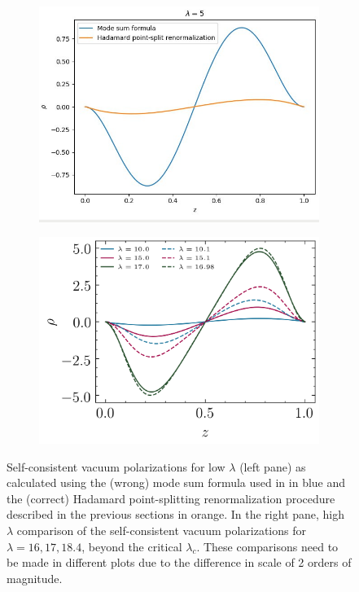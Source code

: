 \begin{figure}
\begin{subfigure}{0.5\textwidth}
    \centering
    \includegraphics[width=0.75\linewidth]{figures/dirichlet/lowLambdaVacuumPolarizationComparison.png}
\end{subfigure}
\begin{subfigure}{0.5\textwidth}
    \centering
    \includegraphics[width=0.75\linewidth]{figures/dirichlet/vacuumPolarizationEvolutionComparison.png} 
 \end{subfigure}
 \caption{Self-consistent vacuum polarizations for low $\lambda$ (left pane) as calculated using the (wrong) mode sum formula used in \cite{Ambj1983} in blue and the (correct) Hadamard point-splitting renormalization procedure described in the previous sections in orange. In the right pane, high $\lambda$ comparison of the self-consistent vacuum polarizations for $\lambda = 16, 17, 18.4$, beyond the critical $\lambda_c$. These comparisons need to be made in different plots due to the difference in scale of 2 orders of magnitude.}
    \label{fig:lowLambdaVacuumPolarization}
\end{figure}

